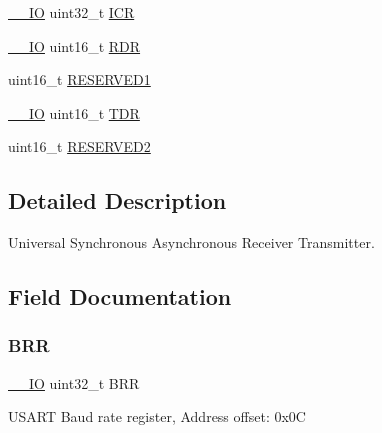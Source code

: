 \begin{DoxyCompactItemize}
\item 
\hyperlink{core__sc300_8h_aec43007d9998a0a0e01faede4133d6be}{\+\_\+\+\_\+\+IO} uint32\+\_\+t \hyperlink{struct_u_s_a_r_t___type_def_a0a8c8230846fd8ff154b9fde8dfa0399}{I\+CR}
\item 
\hyperlink{core__sc300_8h_aec43007d9998a0a0e01faede4133d6be}{\+\_\+\+\_\+\+IO} uint16\+\_\+t \hyperlink{struct_u_s_a_r_t___type_def_ac3397c07a89d7e7c051e37b6d628fdbb}{R\+DR}
\item 
uint16\+\_\+t \hyperlink{struct_u_s_a_r_t___type_def_a8249a3955aace28d92109b391311eb30}{R\+E\+S\+E\+R\+V\+E\+D1}
\item 
\hyperlink{core__sc300_8h_aec43007d9998a0a0e01faede4133d6be}{\+\_\+\+\_\+\+IO} uint16\+\_\+t \hyperlink{struct_u_s_a_r_t___type_def_ad6e9b50601cf364203668775f3f9032b}{T\+DR}
\item 
uint16\+\_\+t \hyperlink{struct_u_s_a_r_t___type_def_a5573848497a716a9947fd87487709feb}{R\+E\+S\+E\+R\+V\+E\+D2}
\end{DoxyCompactItemize}


\subsection{Detailed Description}
Universal Synchronous Asynchronous Receiver Transmitter. 

\subsection{Field Documentation}
\mbox{\label{struct_u_s_a_r_t___type_def_a092e59d908b2ca112e31047e942340cb}} 
\subsubsection{\texorpdfstring{B\+RR}{BRR}}
{\footnotesize\ttfamily \hyperlink{core__sc300_8h_aec43007d9998a0a0e01faede4133d6be}{\+\_\+\+\_\+\+IO} uint32\+\_\+t B\+RR}

U\+S\+A\+RT Baud rate register, Address offset\+: 0x0C \mbox{\label{struct_u_s_a_r_t___type_def_ab0ec7102960640751d44e92ddac994f0}} 
